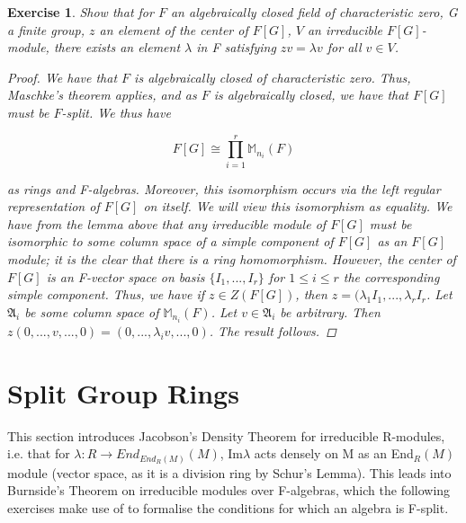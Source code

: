\documentclass{article}
\newtheorem{exercise}{Exercise}[section]
\begin{document}
\begin{exercise}

   Show that for $F$  an algebraically closed field of characteristic zero, G
a finite group, $z$ an element of the center of $F[G]$,  $V$
an irreducible $F[G]$-module, there exists an element $\lambda$ in F
satisfying $zv = \lambda v$ for all $v \in V$.

    \begin{proof}

      We have that $F$ is algebraically closed of characteristic zero. Thus, Maschke's theorem applies, and as $F$ is algebraically closed, we have that $F[G]$ must be $F$-split. We thus have

      \[
        F[G] \cong \prod_{i=1}^{r}\mathbb{M}_{n_{i}}(F) 
      \]

      as rings and F-algebras. Moreover, this isomorphism occurs via the left regular representation of $F[G]$ on itself. We will view this isomorphism as equality. We have from the lemma above that any irreducible module of $F[G]$ must be isomorphic to some column space of a simple component of $F[G]$ as an $F[G]$ module; it is the clear that there is a ring homomorphism. However, the center of $F[G]$ is an F-vector space on basis $\{I_{1},...,I_{r}\}$ for $1\leq i \leq r$ the corresponding simple component. Thus, we have if $z \in Z(F[G])$, then $z = (\lambda_{1}I_{1},...,\lambda_{r}I_{r}$. Let $\mathfrak{A}_{i}$ be some column space of $\mathbb{M}_{n_{i}}(F)$. Let $v \in \mathfrak{A}_{i}$ be arbitrary. Then $z(0,...,v,...,0) = (0,...,\lambda_{i}v,...,0)$. The result follows.  \end{proof}
\end{exercise}


\pagebreak

\section{Split Group Rings}

This section introduces Jacobson's Density Theorem for irreducible R-modules, i.e. that for $\lambda: R \to End_{End_{R}(M)}(M)$, Im$\lambda$ acts densely on M as an End$_{R}(M)$ module (vector space, as it is a division ring by Schur's Lemma). This leads into Burnside's Theorem on irreducible modules over F-algebras, which the following exercises make use of to formalise the conditions for which an algebra is F-split.
\end{document}
